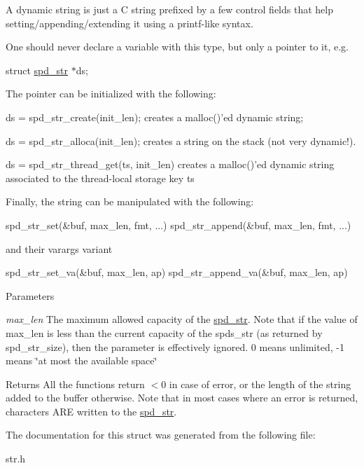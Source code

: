 A dynamic string is just a C string prefixed by a few control fields that help setting/appending/extending it using a printf-\/like syntax.

One should never declare a variable with this type, but only a pointer to it, e.g.

struct \hyperlink{structspd__str}{spd\_\-str} $\ast$ds;

The pointer can be initialized with the following:

ds = spd\_\-str\_\-create(init\_\-len); creates a malloc()'ed dynamic string;

ds = spd\_\-str\_\-alloca(init\_\-len); creates a string on the stack (not very dynamic!).

ds = spd\_\-str\_\-thread\_\-get(ts, init\_\-len) creates a malloc()'ed dynamic string associated to the thread-\/local storage key ts

Finally, the string can be manipulated with the following:

spd\_\-str\_\-set(\&buf, max\_\-len, fmt, ...) spd\_\-str\_\-append(\&buf, max\_\-len, fmt, ...)

and their varargs variant

spd\_\-str\_\-set\_\-va(\&buf, max\_\-len, ap) spd\_\-str\_\-append\_\-va(\&buf, max\_\-len, ap)


\begin{DoxyParams}{Parameters}
\item[{\em max\_\-len}]The maximum allowed capacity of the \hyperlink{structspd__str}{spd\_\-str}. Note that if the value of max\_\-len is less than the current capacity of the spds\_\-str (as returned by spd\_\-str\_\-size), then the parameter is effectively ignored. 0 means unlimited, -\/1 means \char`\"{}at most the available space\char`\"{}\end{DoxyParams}
\begin{DoxyReturn}{Returns}
All the functions return $<$0 in case of error, or the length of the string added to the buffer otherwise. Note that in most cases where an error is returned, characters ARE written to the \hyperlink{structspd__str}{spd\_\-str}. 
\end{DoxyReturn}


The documentation for this struct was generated from the following file:\begin{DoxyCompactItemize}
\item 
str.h\end{DoxyCompactItemize}
